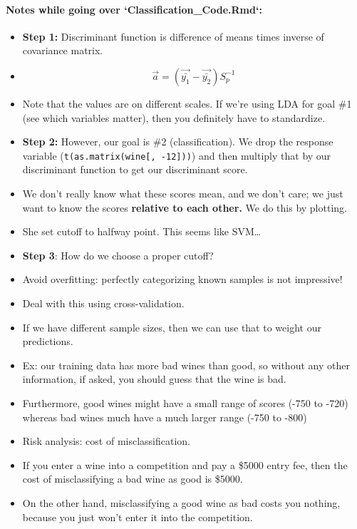 \hypertarget{notes-while-going-over-classification_code.rmd}{%
\paragraph{Notes while going over
`Classification\_Code.Rmd`:}\label{notes-while-going-over-classification_code.rmd}}

\begin{itemize}
\tightlist
\item
  \textbf{Step 1:} Discriminant function is difference of means times
  inverse of covariance matrix.
\item
  \[\vec{a} = (\vec{\bar{y_1}} - \vec{\bar{y_2}}) S_p^{-1}\]
\item
  Note that the values are on different scales. If we're using LDA for
  goal \#1 (see which variables matter), then you definitely have to
  standardize.
\item
  \textbf{Step 2:} However, our goal is \#2 (classification). We drop
  the response variable (\texttt{t(as.matrix(wine{[},\ -12{]}))}) and
  then multiply that by our discriminant function to get our
  discriminant score.
\item
  We don't really know what these scores mean, and we don't care; we
  just want to know the scores \textbf{relative to each other.} We do
  this by plotting.
\item
  She set cutoff to halfway point. This seems like SVM\ldots{}
\item
  \textbf{Step 3}: How do we choose a proper cutoff?
\item
  Avoid overfitting: perfectly categorizing known samples is not
  impressive!
\item
  Deal with this using cross-validation.
\item
  If we have different sample sizes, then we can use that to weight our
  predictions.
\item
  Ex: our training data has more bad wines than good, so without any
  other information, if asked, you should guess that the wine is bad.
\item
  Furthermore, good wines might have a small range of scores (-750 to
  -720) whereas bad wines much have a much larger range (-750 to -800)
\item
  Risk analysis: cost of misclassification.
\item
  If you enter a wine into a competition and pay a \$5000 entry fee,
  then the cost of misclassifying a bad wine as good is \$5000.
\item
  On the other hand, misclassifying a good wine as bad costs you
  nothing, because you just won't enter it into the competition.
\end{itemize}

